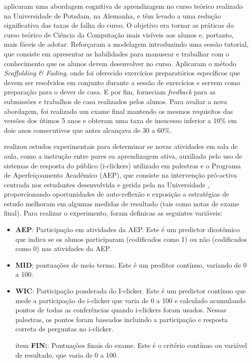  aplicaram uma abordagem cognitiva de aprendizagem no curso teórico realizado na Universidade de Potsdam, na Alemanha, e têm levado a uma redução significativa das taxas de falha do curso. O objetivo era tornar as práticas do curso teórico de Ciência da Computação mais visíveis aos alunos e, portanto, mais fáceis de adotar. Reforçaram a modelagem introduzindo uma sessão tutorial, que consiste em apresentar as habilidades para manusear e trabalhar com o conhecimento que os alunos devem desenvolver no curso. Aplicaram o método \textit{Scaffolding \& Fading}, onde foi oferecido exercícios preparatórios específicos que devem ser resolvidos em conjunto durante a sessão de exercícios e servem como preparação para o dever de casa. E por fim, forneciam \textit{feedback} para as submissões e trabalhos de casa realizados pelos alunos. Para avaliar a nova abordagem, foi realizado um exame final mantendo os mesmos requisitos das versões dos útimos 5 anos e obteram uma taxa de insucesso inferior a 10\% em dois anos consecutivos que antes alcançava de 30 a 60\%.

 realizou estudos experimentais para determinar se novas atividades em sala de aula, como a instrução entre pares ea aprendizagem ativa, auxiliada pelo uso de sistemas de resposta do público (i-clickers) utilizado em palestras e o Programa de Aperfeiçoamento Acadêmico (AEP), que consiste na intervenção pró-activa centrada nos estudantes desenvolvida e gerida pela  na Universidade , proporcionando oportunidades de auto-reflexão e exposição a estratégias de estudo melhoram em algumas medidas de resultado (tais como notas de exame final). Para realizar o experimento, foram definicas as seguintes variáveis:

\begin{itemize}
	\item \textbf{AEP}: Participação em atividades da AEP. Este é um predictor dicotômico que indica se os alunos participaram (codificados como 1) ou não (codificados como 0) nas atividades da AEP.
	
	\item \textbf{MID}: pontuações de meio termo. Este é um preditor contínuo, variando de 0 a 100.
	
	\item \textbf{WIC}: Participação ponderada do I-clicker. Este é um predictor contínuo que mede a participação do i-clicker que varia de 0 a 100 e calculado acumulando pontos de todas as conferências quando i-clickers foram usados. Nessas palestras, os pontos foram baseados incluindo a participação e resposta correta de perguntas no i-clicker.
	
	item \textbf{FIN:}: Pontuações finais do exame. Este é o critério contínuo ou variável de resultado, que varia de 0 a 100.
\end{itemize}

